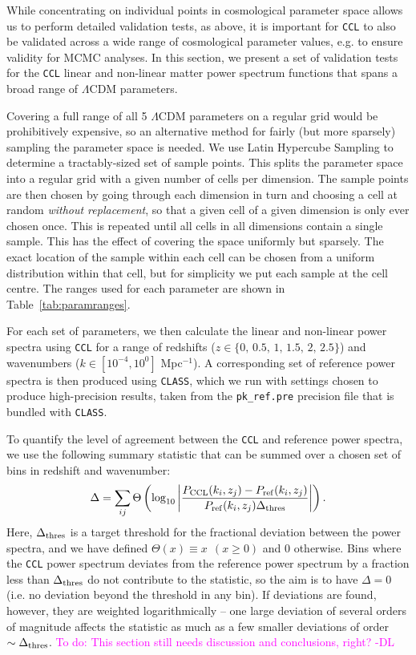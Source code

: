 \documentclass[\docopts]{\docclass}
\newcommand{\todo}[1]{\textcolor{magenta}{To do: #1}}
\newcommand{\ccl}{{\tt CCL}\xspace}
\begin{document}
While concentrating on individual points in cosmological parameter space allows us to perform detailed validation tests, as above, it is important for \ccl to also be validated across a wide range of cosmological parameter values, e.g. to ensure validity for MCMC analyses. In this section, we present a set of validation tests for the \ccl linear and non-linear matter power spectrum functions that spans a broad range of $\Lambda$CDM parameters.

Covering a full range of all 5 $\Lambda$CDM parameters on a regular grid would be prohibitively expensive, so an alternative method for fairly (but more sparsely) sampling the parameter space is needed. We use Latin Hypercube Sampling to determine a tractably-sized set of sample points. This splits the parameter space into a regular grid with a given number of cells per dimension. The sample points are then chosen by going through each dimension in turn and choosing a cell at random {\it without replacement}, so that a given cell of a given dimension is only ever chosen once. This is repeated until all cells in all dimensions contain a single sample. This has the effect of covering the space uniformly but sparsely. The exact location of the sample within each cell can be chosen from a uniform distribution within that cell, but for simplicity we put each sample at the cell centre. The ranges used for each parameter are shown in Table~\ref{tab:paramranges}.
%


For each set of parameters, we then calculate the linear and non-linear power spectra using \ccl for a range of redshifts ($z \in \{ 0,\, 0.5,\, 1,\, 1.5,\, 2,\, 2.5\}$) and wavenumbers ($k \in [10^{-4}, 10^0]$ Mpc$^{-1}$). A corresponding set of reference power spectra is then produced using {\tt CLASS}, which we run with settings chosen to produce high-precision results, taken from the {\tt pk\_ref.pre} precision file that is bundled with {\tt CLASS}.

To quantify the level of agreement between the \ccl and reference power spectra, we use the following summary statistic that can be summed over a chosen set of bins in redshift and wavenumber:
\begin{equation}
\Delta = \sum_{ij} \Theta \left ( \log_{10} \left | \frac{P_{\rm CCL}(k_i, z_j) - P_{\rm ref}(k_i, z_j)}{P_{\rm ref}(k_i, z_j) \Delta_{\rm thres}} \right | \right ).
\end{equation}
Here, $\Delta_{\rm thres}$ is a target threshold for the fractional deviation between the power spectra, and we have defined $\Theta(x) \equiv x ~~(x \ge 0)$ and $0$ otherwise. Bins where the \ccl power spectrum deviates from the reference power spectrum by a fraction less than $\Delta_{\rm thres}$ do not contribute to the statistic, so the aim is to have $\Delta = 0$ (i.e. no deviation beyond the threshold in any bin). If deviations are found, however, they are weighted logarithmically -- one large deviation of several orders of magnitude affects the statistic as much as a few smaller deviations of order $\sim \Delta_{\rm thres}$.
\todo{This section still needs discussion and conclusions, right? -DL}
\end{document}
